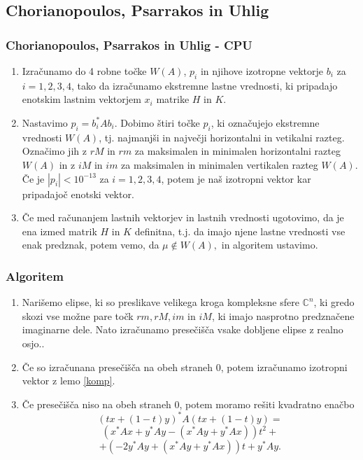 \documentclass{beamer}
\newcommand{\C}{\mathbb C}
\newcounter{saveenumi}
\newcommand{\seti}{\setcounter{saveenumi}{\value{enumi}}}
\newcommand{\conti}{\setcounter{enumi}{\value{saveenumi}}}
\begin{document}
\subsection{Chorianopoulos, Psarrakos in Uhlig}
\begin{frame}
\frametitle{Chorianopoulos, Psarrakos in Uhlig - CPU}

\begin{enumerate}[1.]
\item Izračunamo do 4 robne točke $W(A)$, $p_i$ in njihove izotropne vektorje $b_i$ za $i=1,2,3,4$, tako da izračunamo ekstremne lastne vrednosti, ki pripadajo enotskim lastnim vektorjem $x_i$ matrike $H$ in $K$.\medskip
\item Nastavimo $p_i =b^\ast _i Ab_i$. Dobimo štiri točke $p_i$, ki označujejo ekstremne vrednosti $W(A)$, tj. najmanjši in največji horizontalni in vetikalni razteg. Označimo jih z $rM$ in $rm$ za maksimalen in minimalen horizontalni razteg $W(A)$ in z $iM$ in $im$ za maksimalen in minimalen vertikalen razteg $W(A)$. Če je $|p_i|<10^{-13}$ za $i=1,2,3,4$, potem je naš izotropni vektor kar pripadajoč enotski vektor.\medskip
\item Če med računanjem lastnih vektorjev in lastnih vrednosti ugotovimo, da je ena izmed matrik $H$ in $K$ definitna, t.j. da imajo njene lastne vrednosti vse enak predznak, potem vemo, da $\mu \not\in W(A),$ in algoritem ustavimo.
\seti
\end{enumerate}
\end{frame}\begin{frame}
\frametitle{Algoritem}
\begin{enumerate}[1.]
\conti
\item Narišemo elipse, ki so preslikave velikega kroga kompleksne sfere $\C^n$, ki gredo skozi vse možne pare točk $rm, rM, im$ in $iM$, ki imajo nasprotno predznačene imaginarne dele. Nato izračunamo presečišča vsake dobljene elipse z realno osjo.\medskip.
\item Če so izračunana presečišča na obeh straneh 0, potem izračunamo izotropni vektor z lemo \ref{komp}.\medskip
\item Če presečišča niso na obeh straneh 0, potem moramo rešiti kvadratno enačbo
$$(tx +(1-t)y)^\ast A(tx+(1-t)y)  =$$
$$(x^\ast Ax+y^\ast Ay -(x^\ast Ay +y^\ast Ax))t^2 +$$
$$+(-2y^\ast Ay +(x^\ast Ay+y^\ast Ax))t +y^\ast Ay.$$

\seti
\end{enumerate}
\end{frame}
\end{document}
